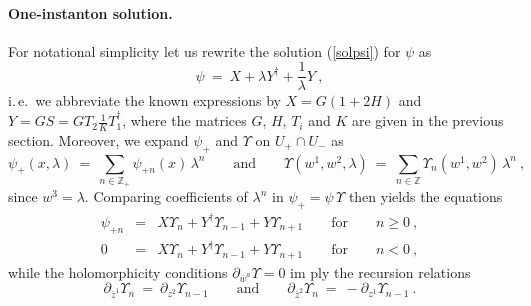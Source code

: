 \documentclass[a4paper,11pt,english]{article}
\numberwithin{equation}{section}
\renewcommand{\=}{\ =\ }
\begin{document}
\paragraph{One-instanton solution.} 
For notational simplicity let us rewrite the solution (\ref{solpsi}) 
for $\psi$ as
\begin{equation}
 \psi\=X+\lambda Y^\dagger+\frac{1}{\lambda}Y\ ,
\end{equation}
i.\,e.\ we abbreviate the known expressions by $X=G(1{+}2H)$ and 
$Y=GS=GT_2\frac{1}{K}T_1^\dagger$, where the matrices $G$, $H$, $T_i$ and $K$
are given in the previous section. 
Moreover, we expand $\psi_+$ and $\Upsilon$ 
on $U_+\cap U_-$ as
\begin{equation}
 \psi_+(x,\lambda)\=\sum_{n\in\mathbb{Z}_+}\psi_{+n}(x)\,\lambda^n
 \qquad\text{and}\qquad
 \Upsilon(w^1,w^2,\lambda)\=\sum_{n\in\mathbb{Z}}\Upsilon_n(w^1,w^2)\,\lambda^n
 \ ,
\end{equation}
since $w^3=\lambda$. Comparing coefficients of $\lambda^n$ in
$\psi_+=\psi\,\Upsilon$ then yields the equations
\begin{subequations}
\begin{eqnarray}
 \psi_{+n} &=& X\Upsilon_n+Y^\dagger\Upsilon_{n-1}+Y\Upsilon_{n+1}\qquad%
\text{for}\qquad n\geq 0\ ,\label{bla1}\\
 0         &=& X\Upsilon_n+Y^\dagger\Upsilon_{n-1}+Y\Upsilon_{n+1}\qquad%
\text{for}\qquad n< 0\ ,\label{bla2}
\end{eqnarray}
\end{subequations}
while the holomorphicity conditions $\partial_{\bar{w}^a}\Upsilon=0$ im%
ply the recursion relations
\begin{equation}\label{con}
 \partial_{\bar{z}^1}\Upsilon_n\=\partial_{z^2}\Upsilon_{n-1}\qquad\text%
{and}\qquad
 \partial_{\bar{z}^2}\Upsilon_n\=-\partial_{z^1}\Upsilon_{n-1}\ .
\end{equation}
\end{document}
